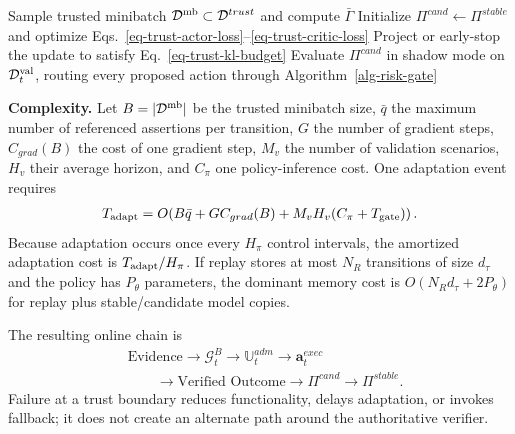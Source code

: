 \begin{algorithm}[t]
\caption{Trust-Gated Online Recovery Policy Adaptation}
\label{alg-trust-policy}
Sample trusted minibatch $\mathcal{D}^{\rm mb}\subset\mathcal{D}^{trust}$ and compute $\bar\Gamma$\;
Initialize $\Pi^{cand}\leftarrow\Pi^{stable}$ and optimize Eqs.~\ref{eq-trust-actor-loss}--\ref{eq-trust-critic-loss}\;
Project or early-stop the update to satisfy Eq.~\ref{eq-trust-kl-budget}\;
Evaluate $\Pi^{cand}$ in shadow mode on $\mathcal{D}_t^{\rm val}$, routing every proposed action through Algorithm~\ref{alg-risk-gate}\;
\;
\end{algorithm}

\noindent\textbf{Complexity.}
Let $B=|\mathcal D^{\rm mb}|$ be the trusted minibatch size, $\bar q$ the maximum number of referenced assertions per transition, $G$ the number of gradient steps, $C_{grad}(B)$ the cost of one gradient step, $M_v$ the number of validation scenarios, $H_v$ their average horizon, and $C_\pi$ one policy-inference cost. One adaptation event requires
\begin{align}
\label{eq-complexity-trust-policy}
T_{\rm adapt}=O\!\left(B\bar q+GC_{grad}(B)+M_vH_v(C_\pi+T_{\rm gate})\right).
\end{align}
Because adaptation occurs once every $H_\pi$ control intervals, the amortized adaptation cost is $T_{\rm adapt}/H_\pi$. If replay stores at most $N_R$ transitions of size $d_\tau$ and the policy has $P_\theta$ parameters, the dominant memory cost is $O(N_Rd_\tau+2P_\theta)$ for replay plus stable/candidate model copies.

The resulting online chain is
\begin{align}
\label{eq-end-to-end-chain}
&\text{Evidence}\rightarrow\mathcal{G}_t^B\rightarrow\mathbb{U}_t^{adm}
\rightarrow\mathbf{a}_t^{exec}\nonumber\\
&\qquad\rightarrow\text{Verified Outcome}\rightarrow\Pi^{cand}\rightarrow\Pi^{stable}.
\end{align}
Failure at a trust boundary reduces functionality, delays adaptation, or invokes fallback; it does not create an alternate path around the authoritative verifier.